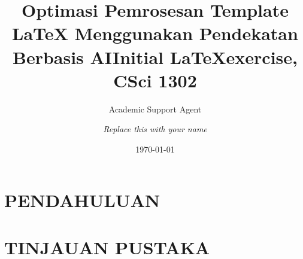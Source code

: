 \documentclass{article}
\title{Optimasi Pemrosesan Template LaTeX Menggunakan Pendekatan Berbasis AI}
\author{Academic Support Agent}
\date{\today}
\begin{document}
\maketitle

\begin{abstract}

\end{abstract}

\chapter{PENDAHULUAN}


\chapter{TINJAUAN PUSTAKA}



\usepackage[english]{babel}
\usepackage[utf8x]{inputenc}
\usepackage{amsmath}
\usepackage{amsthm}
\usepackage{graphicx}
\usepackage[colorinlistoftodos]{todonotes}

\title{Initial \LaTeX exercise, CSci 1302}
\author{\emph{Replace this with your name}}
\end{document}
